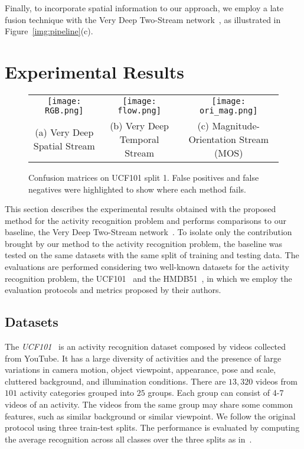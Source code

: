 \documentclass[10pt,conference]{IEEEtran}
\begin{document}
Finally, to incorporate spatial information to our approach, we employ a late fusion technique with the Very Deep Two-Stream network~\cite{Wang:2015}, as illustrated in Figure~\ref{img:pipeline}(c).

\section{Experimental Results}\label{experiments}

\begin{figure*}[!htb]
	\centering
	\begin{tabular}{ccc}
		\texttt{[image: RGB.png]} & \texttt{[image: flow.png]} & \texttt{[image: ori\_mag.png]}\\
		\footnotesize{(a) Very Deep Spatial Stream} & \footnotesize{(b) Very Deep Temporal Stream} & \footnotesize{(c) Magnitude-Orientation Stream (MOS)}\\
	\end{tabular}
	\caption{Confusion matrices on UCF101 split 1. False positives and false negatives were highlighted to show where each method fails.}
	\label{img:confusion_matrices}
\end{figure*}

This section describes the experimental results obtained with the proposed method for the activity recognition problem and performs comparisons to our baseline, the Very Deep Two-Stream network~\cite{Wang:2015}. To isolate only the contribution brought by our method to the activity recognition problem, the baseline was tested on the same datasets with the same split of training and testing data. The evaluations are performed considering two well-known datasets for the activity recognition problem, the UCF101~\cite{Soomro:2012} and the HMDB51~\cite{Kuehne:2011}, in which we employ the evaluation protocols and metrics proposed by their authors.

\subsection{Datasets}

The \emph{UCF101}~\cite{Soomro:2012} is an activity recognition dataset composed by videos collected from YouTube. It has a large diversity of activities and the presence of large variations in camera motion, object viewpoint, appearance, pose and scale, cluttered background, and illumination conditions. There are $13,320$ videos from $101$ activity categories grouped into $25$ groups. Each group can consist of 4-7 videos of an activity. The videos from the same group may share some common features, such as similar background or similar viewpoint. We follow the original protocol using three train-test splits. The performance is evaluated by computing the average recognition across all classes over the three splits as in~\cite{Wang:2015}.
\end{document}
